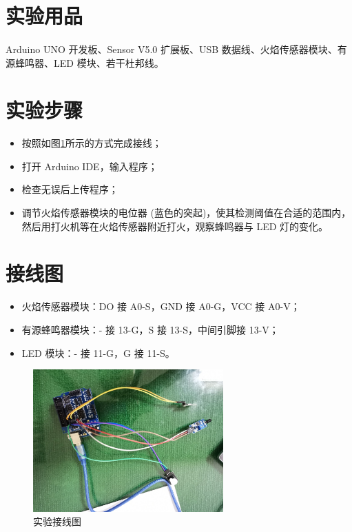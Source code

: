 \documentclass[UTF8, oneside]{ctexbook}
\begin{document}
\section{实验用品}
\paragraph{}
Arduino UNO 开发板、Sensor V5.0 扩展板、USB 数据线、火焰传感器模块、有源蜂鸣器、LED 模块、若干杜邦线。

\section{实验步骤}
\begin{itemize}
    \item[(1)] 按照如图\ref{s9_line}所示的方式完成接线；
    \item[(2)] 打开 Arduino IDE，输入程序；
    \item[(3)] 检查无误后上传程序；
    \item[(4)] 调节火焰传感器模块的电位器 (蓝色的突起)，使其检测阈值在合适的范围内，
    然后用打火机等在火焰传感器附近打火，观察蜂鸣器与 LED 灯的变化。
\end{itemize}

\section{接线图}
\begin{itemize}
    \item 火焰传感器模块：DO 接 A0-S，GND 接 A0-G，VCC 接 A0-V；
    \item 有源蜂鸣器模块：- 接 13-G，S 接 13-S，中间引脚接 13-V；
    \item LED 模块：- 接 11-G，G 接 11-S。
\end{itemize}
\begin{figure}[h]
    \centering
    \includegraphics[width=0.65\textwidth]{./result/sensor/9/lines2.jpg}
    \caption{实验接线图}
    \label{s9_line}
\end{figure}
\end{document}
